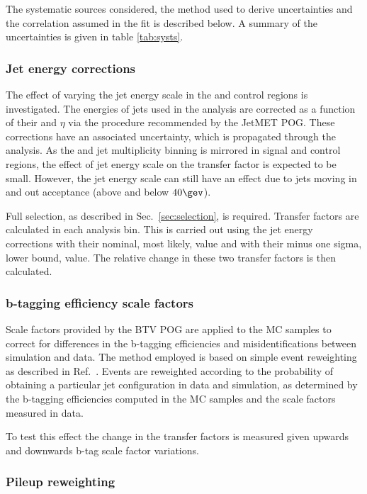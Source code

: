 The systematic sources considered, the method used to derive uncertainties and the 
correlation assumed in the fit is described below.
A summary of the uncertainties is given in table \ref{tab:systs}.


\subsubsection{Jet energy corrections}
The effect of varying the jet energy scale in
the \mj and \mmj control regions is investigated.  The energies of
jets used in the analysis are corrected as a function of their \pt and
$\eta$ via the procedure recommended by the JetMET POG. These
corrections have an associated uncertainty, which is propagated through the analysis. 
As the \scalht and jet multiplicity binning is mirrored in signal and control regions, 
the effect of jet energy scale on the transfer factor is expected to be small. 
However, the jet energy scale can still have an
effect due to jets moving in and out acceptance (above and below
$40\gev$).

Full selection, as described in Sec.~\ref{sec:selection}, is required.
Transfer factors are
calculated in each analysis bin. This
is carried out using the jet energy corrections with their nominal,
most likely, value and with their minus one sigma, lower bound,
value. The relative change in these two transfer factors is then
calculated. 

\subsubsection{b-tagging efficiency scale factors}

Scale factors provided by the BTV POG are applied to the MC samples
to correct for differences in the b-tagging efficiencies and 
misidentifications between simulation and data. The method employed is
based on simple event reweighting as described in
Ref.~\cite{btagSFMethods}. Events are reweighted according to the
probability of obtaining a particular jet configuration in data
and simulation, as determined by the b-tagging efficiencies computed
in the MC samples and the scale factors measured in data.

To test this effect the change in the transfer factors is measured
given upwards and downwards b-tag scale factor variations.

\subsubsection{Pileup reweighting}

